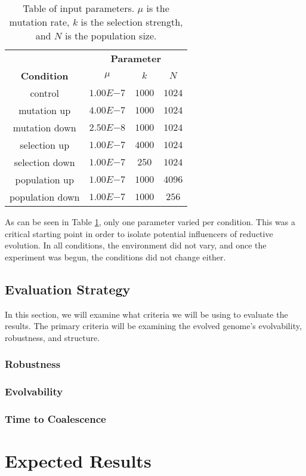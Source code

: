 \begin{table}[h]
	\centering
	\begin{tabular}{|c||c|c|c|}
		\hline
		 & \multicolumn{3}{c|}{\textbf{Parameter}} \\
		\cline{2-4}
		\textbf{Condition} &$\mu$ & $k$ & $N$ \\
		\hline
		control & $1.00E{-7}$ & $1000$ & $1024$ \\
		\hline
		mutation up & $4.00E{-7}$ & $1000$ & $1024$ \\
		\hline
		mutation down & $2.50E{-8}$ & $1000$ & $1024$ \\
		\hline
		selection up & $1.00E{-7}$ & $4000$ & $1024$ \\
		\hline
		selection down & $1.00E{-7}$ & $250$ & $1024$ \\
		\hline
		population up & $1.00E{-7}$ & $1000$ & $4096$ \\
		\hline
		population down & $1.00E{-7}$ & $1000$ & $256$ \\		
		\hline
	\end{tabular}
	\caption[Table of parameters]{Table of input parameters. $\mu$ is the mutation rate, $k$ is the selection strength, and $N$ is the population size.}
	\label{table:parameters}
\end{table}
As can be seen in Table \ref{table:parameters}, only one parameter varied per condition. This was a critical starting point in order to isolate potential influencers of reductive evolution. In all conditions, the environment did not vary, and once the experiment was begun, the conditions did not change either. 
\subsection{Evaluation Strategy}
In this section, we will examine what criteria we will be using to evaluate the results. The primary criteria will be examining the evolved genome's evolvability, robustness, and structure. 
\subsubsection{Robustness}
\subsubsection{Evolvability}
\subsubsection{Time to Coalescence}

\section{Expected Results}





